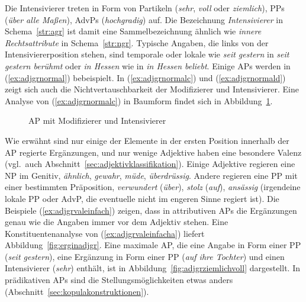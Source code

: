 Die Intensivierer treten in Form von Partikeln (\zB \textit{sehr}, \textit{voll} oder \textit{ziemlich}), PPs (\zB \textit{über alle Maßen}), AdvPs (\zB \textit{hochgradig}) auf.
Die Bezeichnung \textit{Intensivierer} in Schema~\ref{str:agr} ist damit eine Sammelbezeichnung ähnlich wie \textit{innere Rechtsattribute} in Schema~\ref{str:ngr}.
Typische Angaben, die links von der Intensiviererposition stehen, sind \zB temporale oder lokale wie \textit{seit gestern} in \textit{seit gestern berühmt} oder \textit{in Hessen} wie in \textit{in Hessen beliebt}. 
Einige APs werden in (\ref{ex:adjgrnormal}) bebeispielt.
In (\ref{ex:adjgrnormalc}) und (\ref{ex:adjgrnormald}) zeigt sich auch die Nichtvertauschbarkeit der Modifizierer und Intensivierer.
Eine Analyse von (\ref{ex:adjgrnormalc}) in Baumform findet sich in Abbildung~\ref{fig:adgrnormalana}.

\begin{exe}
  \ex\label{ex:adjgrnormal}
  \begin{xlist}
  \end{xlist}
\end{exe}

\begin{figure}[!htbp]
  \centering
  \caption{AP mit Modifizierer und Intensivierer}
  \label{fig:adgrnormalana}
\end{figure}

Wie erwähnt sind nur einige der Elemente in der ersten Position innerhalb der AP regierte Ergänzungen, und
nur wenige Adjektive haben eine besondere Valenz (vgl.\ auch Abschnitt~\ref{sec:adjektivklassifikation}).
Einige Adjektive regieren eine NP im Genitiv, \zB \textit{ähnlich}, \textit{gewahr}, \textit{müde}, \textit{überdrüssig}.
Andere regieren eine PP mit einer bestimmten Präposition, \zB \textit{verwundert} (\textit{über}), \textit{stolz} (\textit{auf}), \textit{ansässig} (irgendeine lokale PP oder AdvP, die eventuelle nicht im engeren Sinne regiert ist).
Die Beispiele (\ref{ex:adjgrvaleinfach}) zeigen, dass in attributiven APs die Ergänzungen genau wie die Angaben immer vor dem Adjektiv stehen.
Eine Konstituentenanalyse von (\ref{ex:adjgrvaleinfacha}) liefert Abbildung~\ref{fig:erginadjgr}.
Eine maximale AP, die eine Angabe in Form einer PP (\textit{seit gestern}), eine Ergänzung in Form einer PP (\textit{auf ihre Tochter}) und einen Intensivierer (\textit{sehr}) enthält, ist in Abbildung~\ref{fig:adjgrziemlichvoll} dargestellt.
In prädikativen APs sind die Stellungsmöglichkeiten etwas anders (Abschnitt~\ref{sec:kopulakonstruktionen}).

